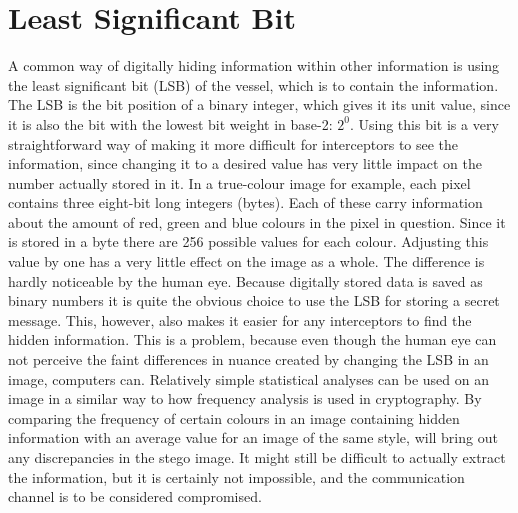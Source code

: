 \section{Least Significant Bit}
A common way of digitally hiding information within other information is using the least significant bit (LSB) of the vessel, which is to contain the information. 
The LSB is the bit position of a binary integer, which gives it its unit value, since it is also the bit with the lowest bit weight in base-2: $2^0$.
Using this bit is a very straightforward way of making it more difficult for interceptors to see the information, since changing it to a desired value has very little impact on the number actually stored in it.
In a true-colour image for example, each pixel contains three eight-bit long integers (bytes). Each of these carry information about the amount of red, green and blue colours in the pixel in question.
Since it is stored in a byte there are 256 possible values for each colour. Adjusting this value by one has a very little effect on the image as a whole. The difference is hardly noticeable by the human eye.
Because digitally stored data is saved as binary numbers it is quite the obvious choice to use the LSB for storing a secret message. This, however, also makes it easier for any interceptors to find the hidden information.
This is a problem, because even though the human eye can not perceive the  faint differences in nuance created by changing the LSB in an image, computers can. 
Relatively simple statistical analyses can be used on an image in a similar way to how frequency analysis is used in cryptography. 
By comparing the frequency of certain colours in an image containing hidden information with an average value for an image of the same style, will bring out any discrepancies in the stego image. 
It might still be difficult to actually extract the information, but it is certainly not impossible, and the communication channel is to be considered compromised.